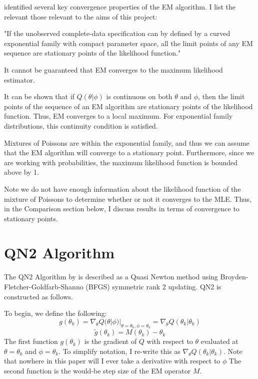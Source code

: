 \documentclass[letter,12pt]{article}
\begin{document}
\cite{wu1983} identified several key convergence properties of the EM algorithm.  I list the relevant those relevant to the aims of this project:
\begin{list}{-}{}
\item "If the unobserved complete-data specification can by defined by a curved exponential family with compact parameter space, all the limit points of any EM sequence are stationary points of the likelihood function."
\item It cannot be guaranteed that EM converges to the maximum likelihood estimator.
\item It can be shown that if $Q(\theta|\phi)$ is continuous on both $\theta$ and $\phi$, then the limit points of the sequence of an EM algorithm are stationary points of the likelihood function.  Thus, EM converges to a local maximum.  For exponential family distributions, this continuity condition is satisfied.
\end{list}

Mixtures of Poissons are within the exponential family, and thus we can assume that the EM algorithm will converge to a stationary point.  Furthermore, since we are working with probabilities, the maximum likelihood function is bounded above by 1. 

Note we do not have enough information about the likelihood function of the mixture of Poissons to determine whether or not it converges to the MLE.  Thus, in the Comparison section below, I discuss results in terms of convergence to stationary points.

\section{QN2 Algorithm}

The QN2 Algorithm by \cite{jamshidianj97} is described as a Quasi Newton method using Broyden-Fletcher-Goldfarb-Shanno (BFGS) symmetric rank 2 updating.  QN2 is constructed as follows.   

To begin, we define the following:
\begin{equation} \label{eq:define_g}
g(\theta_k) = \nabla_{\theta}Q(\theta|\phi)|_{\theta =\theta_k, \phi = \theta_k}
= \nabla_{\theta}Q(\theta_k|\theta_k)
\end{equation}
\begin{equation} \label{eq:define_gsquiggly}
\tilde{g}(\theta_k) = M(\theta_k) - \theta_k
\end{equation}
The first function $g(\theta_k)$ is the gradient of $Q$ with respect to $\theta$ evaluated at $\theta = \theta_k$ and $\phi=\theta_k$.  To simplify notation, I re-write this as $\nabla_{\theta}Q(\theta_k|\theta_k)$.  Note that nowhere in this paper will I ever take a derivative with respect to $\phi$ The second function is the would-be step size of the EM operator $M$.   
\end{document}
